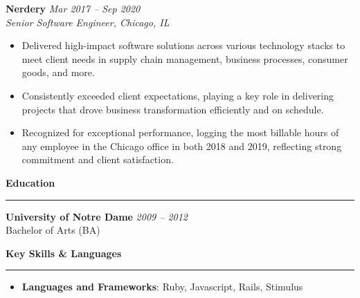 \documentclass[letterpaper,10pt]{article}
\newcommand{\resheading}[1]{
  \vspace{15pt}
  \textbf{\large #1}
  \vspace{5pt}
  \hrule
  \vspace{10pt}
}
\begin{document}
\textbf{Nerdery} \hfill \textit{Mar 2017 -- Sep 2020}\\
\emph{Senior Software Engineer, Chicago, IL}\\
\begin{itemize}
  \item Delivered high-impact software solutions across various technology stacks to meet client needs in supply chain management, business processes, consumer goods, and more.
  \item Consistently exceeded client expectations, playing a key role in delivering projects that drove business transformation efficiently and on schedule.
  \item Recognized for exceptional performance, logging the most billable hours of any employee in the Chicago office in both 2018 and 2019, reflecting strong commitment and client satisfaction.
\end{itemize}

\resheading{Education}
\textbf{University of Notre Dame} \hfill \textit{2009 -- 2012}\\
Bachelor of Arts (BA)

\resheading{Key Skills \& Languages}
\begin{itemize}
  \item \textbf{Languages and Frameworks}: Ruby, Javascript, Rails, Stimulus
\end{itemize}

\end{document}
